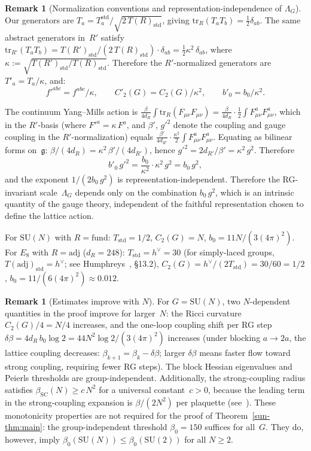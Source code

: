 \documentclass[11pt]{article}
\theoremstyle{definition}
\newtheorem{remark}[theorem]{Remark}
\newcommand{\SU}{\mathrm{SU}}
\newcommand{\tr}{\mathrm{tr}}
\newcommand{\fg}{\mathfrak{g}}
\begin{document}
\begin{remark}[Normalization conventions and
representation-independence of $\Lambda_G$]
Our generators are
$T_a=T_a^{\mathrm{std}}/\sqrt{2\,T(R)_{\mathrm{std}}}$,
giving $\tr_R(T_a T_b)=\frac{1}{2}\delta_{ab}$.
The same abstract generators in~$R'$ satisfy
$\tr_{R'}(T_a T_b)
=T(R')_{\mathrm{std}}/(2\,T(R)_{\mathrm{std}})
\cdot\delta_{ab}
=\frac{1}{2}\kappa^2\,\delta_{ab}$,
where $\kappa:=\sqrt{T(R')_{\mathrm{std}}/T(R)_{\mathrm{std}}}$.
Therefore the $R'$-normalized generators are
$T'_a=T_a/\kappa$, and:
\[
f'^{abc}=f^{abc}/\kappa,\qquad
C'_2(G)=C_2(G)/\kappa^2,\qquad
b'_0=b_0/\kappa^2.
\]

The continuum Yang--Mills action is
$\frac{\beta}{4d_R}\int\!\tr_R(F_{\mu\nu}F_{\mu\nu})
=\frac{\beta}{4d_R}\cdot\frac{1}{2}
\int\! F^a_{\mu\nu}F^a_{\mu\nu}$,
which in the $R'$-basis (where $F'^a=\kappa\,F^a$,
and $\beta'$, $g'^2$ denote the coupling and gauge
coupling in the $R'$-normalization) equals
$\frac{\beta'}{4d_{R'}}\cdot\frac{\kappa^2}{2}
\int\!F^a_{\mu\nu}F^a_{\mu\nu}$.
Equating as bilinear forms on~$\fg$:
$\beta/(4d_R)=\kappa^2\,\beta'/(4d_{R'})$,
hence $g'^2=2d_{R'}/\beta'=\kappa^2\,g^2$.
Therefore
\begin{equation}\label{sun-eq:lambda-invariance}
b'_0\,g'^2
=\frac{b_0}{\kappa^2}\cdot\kappa^2\,g^2
=b_0\,g^2,
\end{equation}
and the exponent $1/(2b_0\,g^2)$ is
representation-independent.
Therefore the RG-invariant scale~$\Lambda_G$ depends
only on the combination $b_0\,g^2$, which is an
intrinsic quantity of the gauge theory, independent of
the faithful representation chosen to define the lattice
action.

For $\SU(N)$ with $R=\mathrm{fund}$:
$T_{\mathrm{std}}=1/2$,
$C_2(G)=N$, $b_0=11N/(3(4\pi)^2)$.
For $E_8$ with $R=\mathrm{adj}$ ($d_R=248$):
$T_{\mathrm{std}}=h^\vee=30$
(for simply-laced groups,
$T(\mathrm{adj})_{\mathrm{std}}=h^\vee$;
see Humphreys~\cite{Humphreys}, \S13.2),
$C_2(G)=h^\vee/(2T_{\mathrm{std}})
=30/60=1/2$,
$b_0=11/(6(4\pi)^2)\approx 0.012$.
\end{remark}

\begin{remark}[Estimates improve with $N$]
\label{sun-rem:improve}
For $G=\SU(N)$, two $N$-dependent quantities in
the proof improve for larger~$N$:
the Ricci curvature $C_2(G)/4=N/4$ increases, and
the one-loop coupling shift per RG step
$\delta\beta=4d_R\,b_0\log 2
=44N^2\log 2/(3(4\pi)^2)$ increases
(under blocking $a\to 2a$, the lattice coupling
decreases: $\beta_{k+1}=\beta_k-\delta\beta$;
larger $\delta\beta$ means faster flow toward strong
coupling, requiring fewer RG steps).  The block Hessian eigenvalues and
Peierls thresholds are group-independent.
Additionally, the strong-coupling radius satisfies
$\beta_{\mathrm{SC}}(N)\ge c\,N^2$ for a universal
constant~$c>0$, because the leading term in the
strong-coupling expansion is $\beta/(2N^2)$
per plaquette (see~\cite{Munster81}).
These monotonicity properties are not required for the
proof of Theorem~\ref{sun-thm:main}: the group-independent
threshold $\beta_0=150$ suffices for all~$G$.
They do, however, imply
$\beta_0(\SU(N))\le\beta_0(\SU(2))$ for all $N\ge 2$.
\end{remark}
\end{document}
